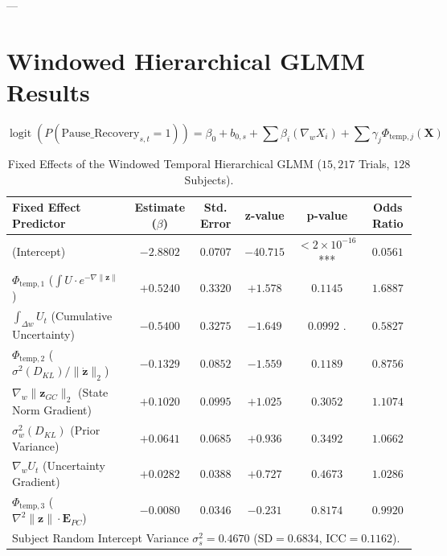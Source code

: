 \documentclass[11pt,twoside,a4paper]{article}
\begin{document}
---

\section{Windowed Hierarchical GLMM Results}

\begin{equation}
\operatorname{logit}\left( P(\text{Pause\_Recovery}_{s,t} = 1) \right) = \beta_0 + b_{0,s} + \sum \beta_i (\nabla_w X_i) + \sum \gamma_j \Phi_{\text{temp},j}(\mathbf{X})
\end{equation}

\begin{table}[H]
\centering
\caption{Fixed Effects of the Windowed Temporal Hierarchical GLMM ($15,217$ Trials, $128$ Subjects).}
\label{tab:glmm_temp}
\vspace{0.4em}
\small
\begin{tabular}{l c c c c c}
\toprule
\textbf{Fixed Effect Predictor} & \textbf{Estimate ($\beta$)} & \textbf{Std. Error} & \textbf{z-value} & \textbf{p-value} & \textbf{Odds Ratio} \\
\midrule
(Intercept) & $-2.8802$ & $0.0707$ & $-40.715$ & $< 2 \times 10^{-16}$ *** & $0.0561$ \\
$\Phi_{\text{temp},1}$ ($\int U \cdot e^{-\nabla \|\mathbf{z}\|}$) & $+0.5240$ & $0.3320$ & $+1.578$ & $0.1145$ & $1.6887$ \\
$\int_{\Delta w} U_t$ (Cumulative Uncertainty) & $-0.5400$ & $0.3275$ & $-1.649$ & $0.0992$ . & $0.5827$ \\
$\Phi_{\text{temp},2}$ ($\sigma^2(D_{KL}) / \|\dot{\mathbf{z}}\|_2$) & $-0.1329$ & $0.0852$ & $-1.559$ & $0.1189$ & $0.8756$ \\
$\nabla_w \|\mathbf{z}_{GC}\|_2$ (State Norm Gradient) & $+0.1020$ & $0.0995$ & $+1.025$ & $0.3052$ & $1.1074$ \\
$\sigma^2_w(D_{KL})$ (Prior Variance) & $+0.0641$ & $0.0685$ & $+0.936$ & $0.3492$ & $1.0662$ \\
$\nabla_w U_t$ (Uncertainty Gradient) & $+0.0282$ & $0.0388$ & $+0.727$ & $0.4673$ & $1.0286$ \\
$\Phi_{\text{temp},3}$ ($\nabla^2 \|\mathbf{z}\| \cdot \mathbf{E}_{PC}$) & $-0.0080$ & $0.0346$ & $-0.231$ & $0.8174$ & $0.9920$ \\
\midrule
\multicolumn{6}{l}{Subject Random Intercept Variance $\sigma_s^2 = 0.4670$ ($\text{SD} = 0.6834$, $\text{ICC} = 0.1162$).} \\
\bottomrule
\end{tabular}
\end{table}
\end{document}

